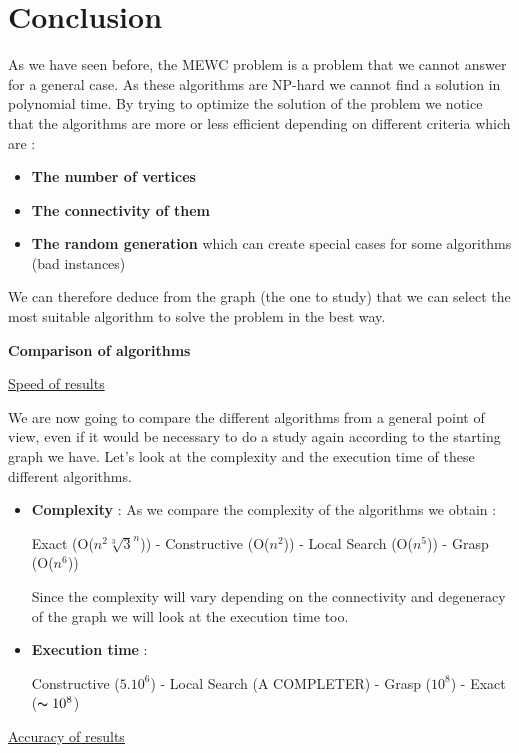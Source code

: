 
\section{Conclusion}

As we have seen before, the MEWC problem is a problem that we cannot answer for a general case. 
As these algorithms are NP-hard we cannot find a solution in polynomial time.
By trying to optimize the solution of the problem we notice that the algorithms are more or less efficient depending on different criteria which are :

\begin{itemize}
    \item \textbf{The number of vertices} 

    \item \textbf{The connectivity of them}

    \item \textbf{The random generation} which can create special cases for some algorithms (bad instances)
\end{itemize}

We can therefore deduce from the graph (the one to study) that we can select the most suitable algorithm to solve the problem in the best way.\bigskip

\large\textbf{Comparison of algorithms} \newline 

\underline{Speed of results}\bigskip

We are now going to compare the different algorithms from a general point of view, even if it would be necessary to do a study again according to the starting graph we have.
Let's look at the complexity and the execution time of these different algorithms.

\begin{itemize}
    \item \textbf{Complexity} : As we compare the complexity of the algorithms we obtain : \bigskip
    
Exact (O($n^2\sqrt[3]{3}^n$)) - Constructive (O($n^2$)) - Local Search (O($n^5$)) - Grasp (O($n^6$)) \bigskip
    
    Since the complexity will vary depending on the connectivity and degeneracy of the graph we will look at the execution time too.
    
    \item \textbf{Execution time} : \bigskip
    
Constructive ($5.10^6$) -  Local Search (A COMPLETER) - Grasp ($10^8$) - Exact ($\thicksim 10^8$) 
\end{itemize}
\underline{Accuracy of results}\bigskip 

